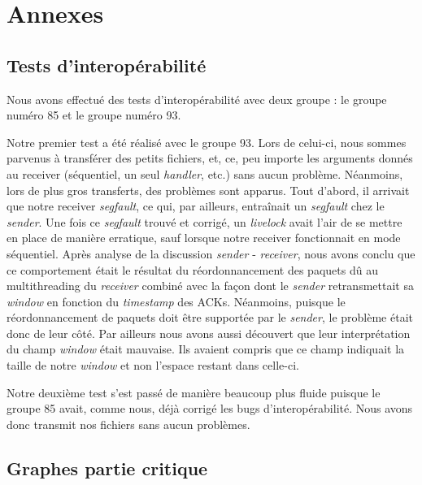 \documentclass[../main.tex]{subfiles}
\begin{document}
\section{Annexes}
\label{sec:annexes}

\subsection{Tests d'interopérabilité}
\label{sec:interop}

Nous avons effectué des tests d'interopérabilité avec deux groupe : le groupe numéro 85 et le groupe numéro 93. 

Notre premier test a été réalisé avec le groupe 93. Lors de celui-ci, nous sommes parvenus à transférer des petits fichiers, et, ce, peu 
importe les arguments donnés au receiver (séquentiel, un seul \textit{handler}, etc.) sans aucun problème. Néanmoins, lors de plus gros transferts, 
des problèmes sont apparus.
Tout d'abord, il arrivait que notre receiver \textit{segfault}, ce qui, par ailleurs, entraînait un \textit{segfault} chez le \textit{sender}.
Une fois ce \textit{segfault} trouvé et corrigé, un \textit{livelock} avait l'air de se mettre en place de manière erratique, sauf lorsque 
notre receiver fonctionnait en mode séquentiel. Après analyse de la discussion \textit{sender} - \textit{receiver}, nous avons conclu
que ce comportement était le résultat du réordonnancement des paquets dû au multithreading du \textit{receiver} combiné avec la façon dont le 
\textit{sender} retransmettait sa \textit{window} en fonction du \textit{timestamp} des ACKs. Néanmoins, puisque le réordonnancement de paquets 
doit être supportée par le \textit{sender}, le problème était donc de leur côté. Par ailleurs nous avons aussi découvert que leur interprétation du 
champ \textit{window} était mauvaise. Ils avaient compris que ce champ indiquait la taille de notre \textit{window} et non l'espace restant dans celle-ci.

Notre deuxième test s'est passé de manière beaucoup plus fluide puisque le groupe 85 avait, comme nous, déjà corrigé les bugs d'interopérabilité.
Nous avons donc transmit nos fichiers sans aucun problèmes.

\subsection{Graphes partie critique}
\label{sec:graph_crit}
\end{document}

